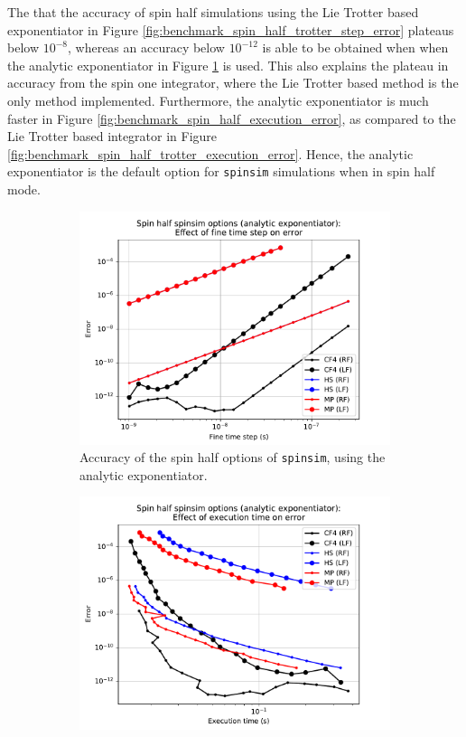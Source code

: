 \documentclass{jors}
\begin{document}
			The that the accuracy of spin half simulations using the Lie Trotter based exponentiator in Figure \ref{fig:benchmark_spin_half_trotter_step_error} plateaus below \(10^{-8}\), whereas an accuracy below \(10^{-12}\) is able to be obtained when when the analytic exponentiator in Figure \ref{fig:benchmark_spin_half_step_error} is used. This also explains the plateau in accuracy from the spin one integrator, where the Lie Trotter based method is the only method implemented. Furthermore, the analytic exponentiator is much faster in Figure \ref{fig:benchmark_spin_half_execution_error}, as compared to the Lie Trotter based integrator in Figure \ref{fig:benchmark_spin_half_trotter_execution_error}. Hence, the analytic exponentiator is the default option for \texttt{spinsim} simulations when in spin half mode.

			\begin{figure}[h!]
				\begin{subfigure}[b]{0.45\textwidth}
					\includegraphics[scale=0.45]{benchmark_spin_half_step_error.pdf}
					\caption{Accuracy of the spin half options of \texttt{spinsim}, using the analytic exponentiator.}
					\label{fig:benchmark_spin_half_step_error}
				\end{subfigure}
				\hfill
				\begin{subfigure}[b]{0.45\textwidth}
					\includegraphics[scale=0.45]{benchmark_spin_half_execution_error.pdf}

\end{subfigure}
\end{figure}
\end{document}
